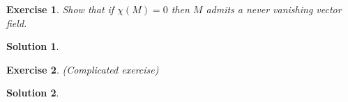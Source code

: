 \documentclass{article}
\newtheorem{ex}{Exercise}
\theoremstyle{nonumberplain}
\newtheorem{sol}{Solution}
\begin{document}
\begin{ex}
Show that if $\chi(M) = 0$ then $M$ admits a never vanishing vector field.
\end{ex}

\begin{sol}

\end{sol}

\begin{ex}
(Complicated exercise)
\end{ex}

\begin{sol}

\end{sol}
\end{document}
